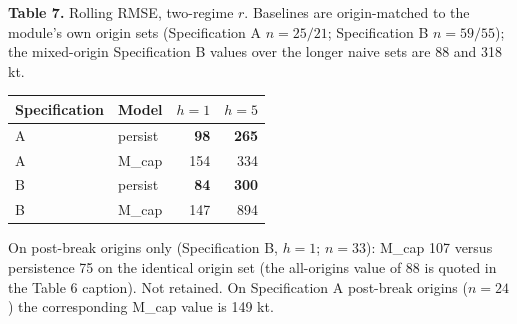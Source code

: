 \documentclass[11pt]{article}
\begin{document}
\textbf{Table 7.} Rolling RMSE, two-regime \(r\). Baselines are origin-matched to the module's own origin sets (Specification A \(n=25/21\); Specification B \(n=59/55\)); the mixed-origin Specification B values over the longer naive sets are 88 and 318 kt.

\begin{longtable}[]{@{}llrr@{}}
\toprule\noalign{}
Specification & Model & \(h=1\) & \(h=5\) \\
\midrule\noalign{}
\endhead
\bottomrule\noalign{}
\endlastfoot
A & persist & \textbf{98} & \textbf{265} \\
A & M\_cap & 154 & 334 \\
B & persist & \textbf{84} & \textbf{300} \\
B & M\_cap & 147 & 894 \\
\end{longtable}

On post-break origins only (Specification B, \(h=1\); \(n=33\)): M\_cap
107 versus persistence 75 on the identical origin set (the all-origins value
of 88 is quoted in the Table 6 caption). Not retained. On Specification A post-break
origins (\(n=24\)) the corresponding M\_cap value is 149 kt.
\end{document}
